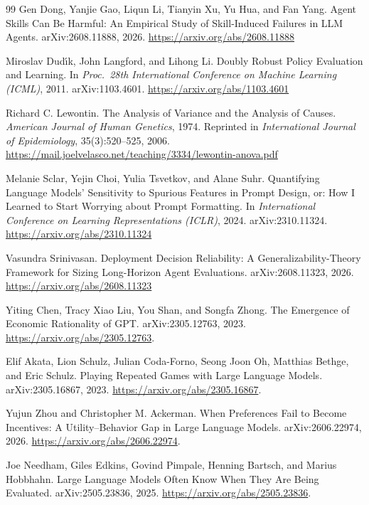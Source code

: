 \documentclass[11pt,a4paper]{article}
\theoremstyle{definition}
\begin{document}
\begin{thebibliography}{99}
Gen Dong, Yanjie Gao, Liqun Li, Tianyin Xu, Yu Hua, and Fan Yang.
\newblock Agent Skills Can Be Harmful: An Empirical Study of Skill-Induced Failures in LLM Agents.
\newblock arXiv:2608.11888, 2026.
\newblock \url{https://arxiv.org/abs/2608.11888}

Miroslav Dud\'{\i}k, John Langford, and Lihong Li.
\newblock Doubly Robust Policy Evaluation and Learning.
\newblock In \textit{Proc.\ 28th International Conference on Machine Learning (ICML)}, 2011. arXiv:1103.4601.
\newblock \url{https://arxiv.org/abs/1103.4601}

Richard C. Lewontin.
\newblock The Analysis of Variance and the Analysis of Causes.
\newblock \textit{American Journal of Human Genetics}, 1974. Reprinted in \textit{International Journal of Epidemiology}, 35(3):520--525, 2006.
\newblock \url{https://mail.joelvelasco.net/teaching/3334/lewontin-anova.pdf}

Melanie Sclar, Yejin Choi, Yulia Tsvetkov, and Alane Suhr.
\newblock Quantifying Language Models' Sensitivity to Spurious Features in Prompt Design, or: How I Learned to Start Worrying about Prompt Formatting.
\newblock In \textit{International Conference on Learning Representations (ICLR)}, 2024. arXiv:2310.11324.
\newblock \url{https://arxiv.org/abs/2310.11324}

Vasundra Srinivasan.
\newblock Deployment Decision Reliability: A Generalizability-Theory Framework for Sizing Long-Horizon Agent Evaluations.
\newblock arXiv:2608.11323, 2026.
\newblock \url{https://arxiv.org/abs/2608.11323}

Yiting Chen, Tracy Xiao Liu, You Shan, and Songfa Zhong.
\newblock The Emergence of Economic Rationality of GPT.
\newblock arXiv:2305.12763, 2023.
\newblock \url{https://arxiv.org/abs/2305.12763}.

Elif Akata, Lion Schulz, Julian Coda-Forno, Seong Joon Oh, Matthias Bethge, and Eric Schulz.
\newblock Playing Repeated Games with Large Language Models.
\newblock arXiv:2305.16867, 2023.
\newblock \url{https://arxiv.org/abs/2305.16867}.

Yujun Zhou and Christopher M. Ackerman.
\newblock When Preferences Fail to Become Incentives: A Utility--Behavior Gap in Large Language Models.
\newblock arXiv:2606.22974, 2026.
\newblock \url{https://arxiv.org/abs/2606.22974}.

Joe Needham, Giles Edkins, Govind Pimpale, Henning Bartsch, and Marius Hobbhahn.
\newblock Large Language Models Often Know When They Are Being Evaluated.
\newblock arXiv:2505.23836, 2025.
\newblock \url{https://arxiv.org/abs/2505.23836}.
\end{thebibliography}
\end{document}
